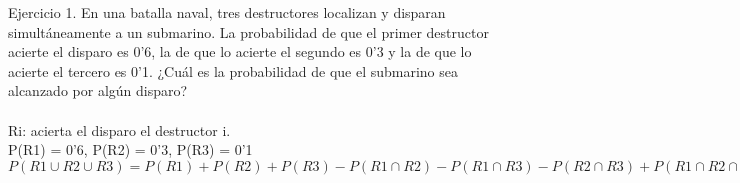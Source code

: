 \documentclass{article}
\begin{document}
Ejercicio 1. En una batalla naval, tres destructores localizan y disparan simultáneamente a un submarino. La probabilidad de que el primer destructor acierte el disparo es 0'6, la de que lo acierte el segundo es 0'3 y la de que lo acierte el tercero es 0'1. ¿Cuál es la probabilidad de que el submarino sea alcanzado por algún disparo? \\ \\
Ri: acierta el disparo el destructor i.\\
P(R1) = 0'6, P(R2) = 0'3, P(R3) = 0'1 \\
$P(R1 \cup R2 \cup R3) = P(R1) + P(R2) + P(R3) - P(R1 \cap R2) - P(R1 \cap R3) - P(R2 \cap R3) + P(R1 \cap R2 \cap R3) = 0'6+0'3+0'1-(0'6*0'1)-(0'6*0'3)-(0'1*0'3)+(0'6*0'3*0'1) = 0'748 $\\
\end{document}
